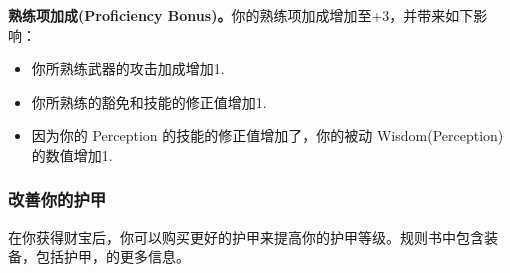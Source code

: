 \documentclass[letterpaper,twocolumn,openany,nodeprecatedcode]{dndbook}
\begin{document}
\textbf{熟练项加成(Proficiency Bonus)。}你的熟练项加成增加至+3，并带来如下影响：
\begin{itemize}
\item 你所熟练武器的攻击加成增加1.
\item 你所熟练的豁免和技能的修正值增加1.
\item 因为你的 Perception 的技能的修正值增加了，你的被动 Wisdom(Perception) 的数值增加1.
\end{itemize}

\subsubsection{改善你的护甲}
在你获得财宝后，你可以购买更好的护甲来提高你的护甲等级。规则书中包含装备，包括护甲，的更多信息。







\end{document}
